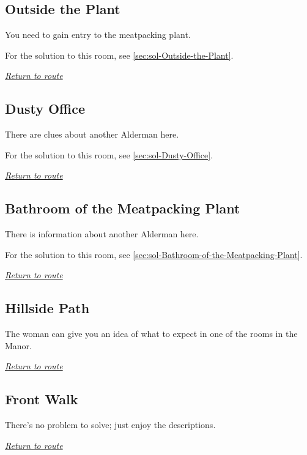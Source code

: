 \documentclass[a5paper]{extarticle}
\begin{document}
\newpage
\subsection{Outside the Plant}\label{sec:req-Outside-the-Plant}

You need to gain entry to the meatpacking plant.

For the solution to this room, see \cref{sec:sol-Outside-the-Plant}.

\hyperref[sec:route-3]{\emph{Return to route}}

\newpage
\subsection{Dusty Office}\label{sec:req-Dusty-Office}

There are clues about another Alderman here.

For the solution to this room, see \cref{sec:sol-Dusty-Office}.

\hyperref[sec:route-3]{\emph{Return to route}}

\newpage
\subsection{Bathroom of the Meatpacking Plant}\label{sec:req-Bathroom-of-the-Meatpacking-Plant}

There is information about another Alderman here.

For the solution to this room, see \cref{sec:sol-Bathroom-of-the-Meatpacking-Plant}.

\hyperref[sec:route-3]{\emph{Return to route}}

\newpage
\subsection{Hillside Path}\label{sec:req-Hillside-Path}

The woman can give you an idea of what to expect in one of the rooms in the Manor.

\hyperref[sec:route-3]{\emph{Return to route}}

\newpage
\subsection{Front Walk}\label{sec:req-Front-Walk}

There's no problem to solve; just enjoy the descriptions.

\hyperref[sec:route-3]{\emph{Return to route}}
\end{document}
